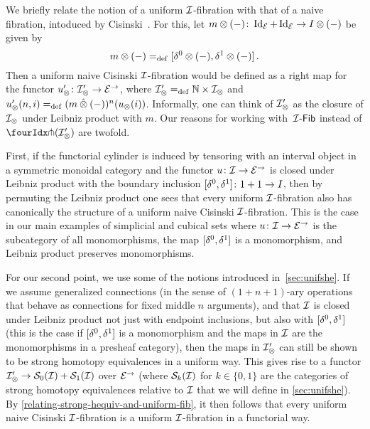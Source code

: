 \documentclass[reqno,10pt,a4paper,oneside,draft]{amsart}
\begin{document}
\begin{remark} \label{cisinski-remark}
We briefly relate the notion of a uniform $\cal{I}$-fibration with that of a naive fibration, intoduced by Cisinski~\cite{cisinski-asterisque}.
For this, let $m \otimes (-)  \co \Id_\catE + \Id_\catE \to \interval \otimes (-)$ be given by
\[
  m \otimes (-) \defeq [\lcyl \otimes (-), \rcyl \otimes (-)] \, .
\]
Then a uniform naive Cisinski $\cal{I}$-fibration would be defined as a right map for the functor $u_\otimes' \co \cal{I}_\otimes' \to \catE^\to$, where $\cal{I}_\otimes' \defeq \mathbb{N} \times \cal{I}_\otimes$ and $u_\otimes'(n, i) \defeq (m \hatotimes (-))^n(u_\otimes(i))$.
Informally, one can think of
$\cal{I}_\otimes'$ as the closure of $\cal{I}_\otimes$ under Leibniz product with $m$.
Our reasons for working with~$\Fib{\cal{I}}$ instead of $\liftr{(\cal{I}_\otimes')}$ are twofold.

First, if the functorial cylinder is induced by tensoring with an interval object in a symmetric monoidal category and the functor $u \co \cal{I} \to \catE^\to$ is closed under Leibniz product with the boundary inclusion $[\lcyl, \rcyl] \co 1 + 1 \to \interval$, then by permuting the Leibniz product one sees that every uniform $\cal{I}$-fibration also has canonically the structure of a uniform naive Cisinski $\cal{I}$-fibration.
This is the case in our main examples of simplicial and cubical sets where $u \co \cal{I} \to \catE^\to$ is the subcategory of all monomorphisms, the map $[\lcyl, \rcyl]$ is a  monomorphism, and Leibniz product preserves  monomorphisms.

For our second point, we use some of the notions introduced in~\cref{sec:unifshe}.
If we assume generalized connections (in the sense of $(1+n+1)$-ary operations that behave as connections for fixed middle $n$ arguments), and that $\cal{I}$ is closed under Leibniz product not just with endpoint inclusions, but also with $[\lcyl, \rcyl]$ (this is the case if $[\lcyl, \rcyl]$ is a  monomorphism and the maps in $\cal{I}$ are the  monomorphisms in a presheaf category), then the maps in $\cal{I}_\otimes'$ can still be shown to be strong homotopy equivalences in a uniform way.
This gives rise to a functor $\cal{I}_\otimes' \to \cal{S}_0(\cal{I}) + \cal{S}_1(\cal{I})$ over $\catE^\to$ (where $\cal{S}_k(\cal{I})$ for $k \in \{0,1\}$ are the categories of strong homotopy equivalences relative to $\cal{I}$ that we will define in \cref{sec:unifshe}).
By \cref{relating-strong-hequiv-and-uniform-fib}, it then follows that every uniform naive Cisinski $\cal{I}$-fibration is a uniform $\cal{I}$-fibration in a functorial way.
\end{remark}
\end{document}
